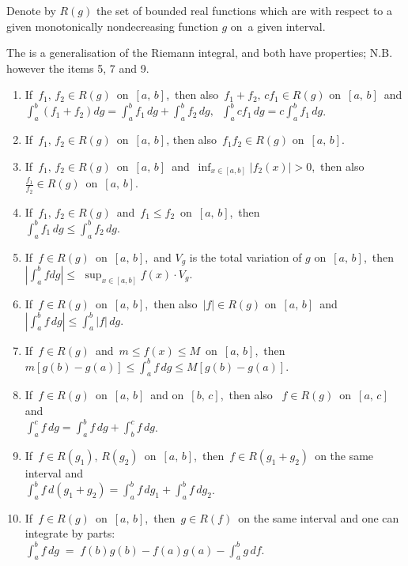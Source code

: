 \documentclass[12pt]{article}
\theoremstyle{definition}
\begin{document}
Denote by $R(g)$ the set of bounded real functions which are  with respect to a given monotonically nondecreasing function $g$ on\, a given interval.

The  is a generalisation of the Riemann integral,  and both have  properties; N.B. however the items 5, 7 and 9.

\begin{enumerate}

\item If\, $f_1,\, f_2 \in R(g)$\, on\, $[a,\,b]$,\, then also\, $f_1\!+\!f_2,\,cf_1 \in R(g)$ on\, $[a,\,b]$\, and\\ 
$\int_a^b(f_1\!+\!f_2)dg = \int_a^bf_1\,dg+\int_a^bf_2\,dg,\;\; \int_a^bcf_1\,dg = c\int_a^bf_1\,dg$.

\item If\, $f_1,\, f_2 \in R(g)$\, on\, $[a,\,b]$, then also\, $f_1f_2 \in R(g)$ on\, $[a,\,b]$.

\item If\, $f_1,\,f_2 \in R(g)$\, on\, $[a,\,b]$\, and\, $\displaystyle\inf_{x\in[a,b]}|f_2(x)| > 0$,\, then also\, 
$\frac{f_1}{f_2} \in R(g)$\, on\, $[a,\,b]$.

\item If\, $f_1,\, f_2 \in R(g)$\, and\, $f_1 \le f_2$\, on\, $[a,\,b]$,\, then\\
$\int_a^bf_1\,dg \le \int_a^bf_2\,dg$.

\item If\, $f \in R(g)$\, on\, $[a,\,b]$,\, and $V_g$ is the total variation of $g$ on\, $[a,\,b]$,\, then\\
$\left|\int_a^bfdg\right| \le$ $\displaystyle\sup_{x\in[a,b]}f(x)\cdot V_g$.

\item If\, $f \in R(g)$\, on\, $[a,\,b]$,\, then also\, $|f| \in R(g)$ on\, $[a,\,b]$\, and\\
$\left|\int_a^bf\,dg\right| \le \int_a^b|f|\,dg$.

\item If\, $f \in R(g)$\, and\, $m \le f(x) \le M$\, on\, $[a,\,b]$,\, then\\
$m[g(b)-g(a)] \le \int_a^bf\,dg \le M[g(b)-g(a)]$.

\item If\, $f \in R(g)$\, on\, $[a,\,b]$\, and on\, $[b,\,c]$,\, then also \, $f\in R(g)$\, on\, $[a,\,c]$\, and\\
$\int_a^cf\,dg = \int_a^bf\,dg+\int_b^cf\,dg$.

\item If\, $f \in R(g_1),\,R(g_2)$\, on\, $[a,\,b]$,\, then\, $f \in R(g_1\!+\!g_2)$\, on the same interval and\\
$\int_a^bf\,d(g_1\!+\!g_2) = \int_a^bf\,dg_1+\int_a^bf\,dg_2$.

\item If\, $f \in R(g)$\, on\, $[a,\,b]$,\, then\, $g \in R(f)$\, on the same interval and one can integrate by parts:\\
$\int_a^bf\,dg \;=\; f(b)g(b)\!-\!f(a)g(a)\!-\int_a^bg\,df$.

\end{enumerate}
\end{document}
